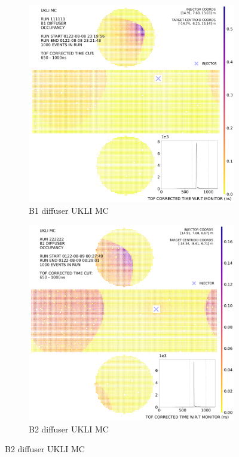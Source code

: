     \begin{figure}[htp]
        \centering
        \caption{Monte Carlo simulations of the B1 - B5 diffuser injectors}
        \label{fig:ukli_mc_diff}
        \begin{subfigure}{0.49\columnwidth}
        \centering
        \includegraphics[width=\textwidth]{Figures/ukli_diff_mc_B1.PNG}
        \caption{B1 diffuser UKLI MC}
        \label{fig:time1}
        \end{subfigure}\hfill
        \begin{subfigure}{0.49\columnwidth}
        \centering
        \includegraphics[width=\textwidth]{Figures/ukli_diff_mc_B2.PNG}
        \caption{B2 diffuser UKLI MC}
        \label{fig:time2}
        \end{subfigure}
        

\end{figure}
